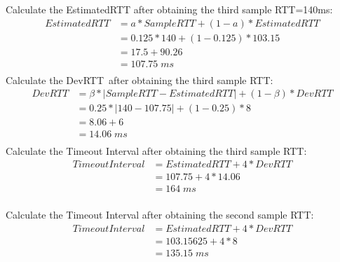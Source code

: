 \documentclass[12pt,a4paper]{article}
\begin{document}
Calculate the EstimatedRTT after obtaining the third sample RTT=140ms:
\begin{equation*}
    \begin{split}
        EstimatedRTT &= a * SampleRTT+(1- a) * EstimatedRTT \\
                     &= 0.125 * 140 + (1-0.125) * 103.15 \\
                     &= 17.5 + 90.26\\
                     &= 107.75 \; ms \\
    \end{split}
\end{equation*}
Calculate the DevRTT after obtaining the third sample RTT:
\begin{equation*}
    \begin{split}
        DevRTT &= \beta * | SampleRTT- EstimatedRTT|+(1- \beta )* DevRTT \\
                     &= 0.25 * |140-107.75| + (1-0.25) *8 \\
                     &= 8.06 + 6 \\
                     &= 14.06 \; ms \\
    \end{split}
\end{equation*}
Calculate the Timeout Interval after obtaining the third sample RTT:
\begin{equation*}
    \begin{split}
        TimeoutInterval &= EstimatedRTT +4* DevRTT \\
                     &= 107.75 + 4 *14.06\\
                     &= 164 \; ms\\
    \end{split}
\end{equation*}

Calculate the Timeout Interval after obtaining the second sample RTT:
\begin{equation*}
    \begin{split}
        TimeoutInterval &= EstimatedRTT +4* DevRTT \\
                     &= 103.15625 + 4 *8\\
                     &= 135.15 \; ms\\
    \end{split}
\end{equation*}
\end{document}
